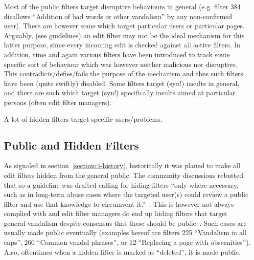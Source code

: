 Most of the public filters target disruptive behaviours in general (e.g. filter 384 disallows ``Addition of bad words or other vandalism'' by any non-confirmed user).
There are however some which target particular users or particular pages.
Arguably, (see guidelines) an edit filter may not be the ideal mechanism for this latter purpose, since every incoming edit is checked against all active filters.
In addition, time and again various filters have been introduced to track some specific sort of behaviour which was however neither malicious nor disruptive.
This contradicts/defies/fails the purpose of the mechanism and thus such filters have been (quite swiftly) disabled.
Some filters target (syn!) insults in general, and there are such which target (syn!) specifically insults aimed at particular persons (often edit filter managers).

A lot of hidden filters target specific users/problems.

\subsection{Public and Hidden Filters}

As signaled in section~\ref{section:4-history}, historically it was planed to make all edit filters hidden from the general public.
The community discussions rebutted that so a guideline was drafted calling for
hiding filters ``only where necessary, such as in long-term abuse cases where the targeted user(s) could review a public filter and use that knowledge to circumvent it.''~\cite{Wikipedia:EditFilter}.
This is however not always complied with and edit filter managers do end up hiding filters that target general vandalism despite consensus that these should be public~\cite{Wikipedia:PrivacyGeneralVandalism}.
Such cases are usually made public eventually (examples hereof are filters 225 ``Vandalism in all caps'', 260 ``Common vandal phrases'', or 12 ``Replacing a page with obscenities'').
Also, oftentimes when a hidden filter is marked as ``deleted'', it is made public. %

